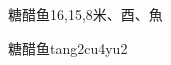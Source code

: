 \begin{entry}{糖醋鱼}{16,15,8}{⽶、⾣、⿂}
  \begin{phonetics}{糖醋鱼}{tang2cu4yu2}
  \end{phonetics}
\end{entry}
